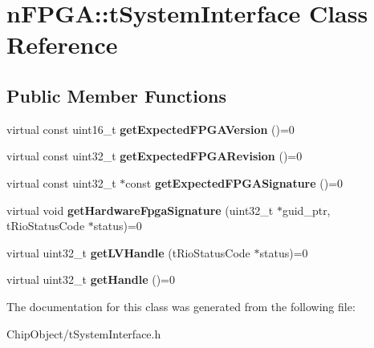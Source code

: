 \hypertarget{classnFPGA_1_1tSystemInterface}{
\section{nFPGA::tSystemInterface Class Reference}
\label{classnFPGA_1_1tSystemInterface}
}
\subsection*{Public Member Functions}
\begin{DoxyCompactItemize}
\item 
\hypertarget{classnFPGA_1_1tSystemInterface_a372f6299e3c2f82dbb41d1a968c20a7b}{
virtual const uint16\_\-t {\bfseries getExpectedFPGAVersion} ()=0}
\label{classnFPGA_1_1tSystemInterface_a372f6299e3c2f82dbb41d1a968c20a7b}

\item 
\hypertarget{classnFPGA_1_1tSystemInterface_a4610e8f33c963c8234f5076218481d5b}{
virtual const uint32\_\-t {\bfseries getExpectedFPGARevision} ()=0}
\label{classnFPGA_1_1tSystemInterface_a4610e8f33c963c8234f5076218481d5b}

\item 
\hypertarget{classnFPGA_1_1tSystemInterface_ad2349819ce4450c8d91a844806de362b}{
virtual const uint32\_\-t $\ast$const {\bfseries getExpectedFPGASignature} ()=0}
\label{classnFPGA_1_1tSystemInterface_ad2349819ce4450c8d91a844806de362b}

\item 
\hypertarget{classnFPGA_1_1tSystemInterface_a21ad5f4f71374823461b01ffe209c60d}{
virtual void {\bfseries getHardwareFpgaSignature} (uint32\_\-t $\ast$guid\_\-ptr, tRioStatusCode $\ast$status)=0}
\label{classnFPGA_1_1tSystemInterface_a21ad5f4f71374823461b01ffe209c60d}

\item 
\hypertarget{classnFPGA_1_1tSystemInterface_add493db40e96f5a3c4eb0ee341b94c50}{
virtual uint32\_\-t {\bfseries getLVHandle} (tRioStatusCode $\ast$status)=0}
\label{classnFPGA_1_1tSystemInterface_add493db40e96f5a3c4eb0ee341b94c50}

\item 
\hypertarget{classnFPGA_1_1tSystemInterface_a1ad7d1555b50c3cda5a8b4b0fba38438}{
virtual uint32\_\-t {\bfseries getHandle} ()=0}
\label{classnFPGA_1_1tSystemInterface_a1ad7d1555b50c3cda5a8b4b0fba38438}

\end{DoxyCompactItemize}


The documentation for this class was generated from the following file:\begin{DoxyCompactItemize}
\item 
ChipObject/tSystemInterface.h\end{DoxyCompactItemize}
